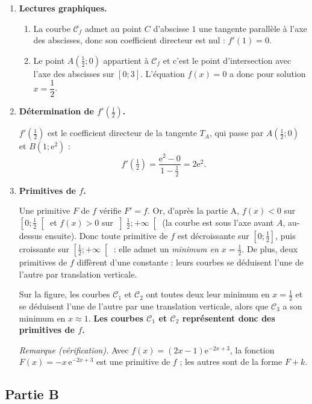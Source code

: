 \documentclass[11pt,a4paper]{article}
\newcommand{\e}{\mathrm{e}}
\begin{document}
\begin{enumerate}

\item \textbf{Lectures graphiques.}

\begin{enumerate}
\item La courbe $\mathcal{C}_f$ admet au point $C$ d'abscisse $1$ une tangente parallèle à l'axe des abscisses,
donc son coefficient directeur est nul : $f'(1)=0$.

\item Le point $A\left(\tfrac12;0\right)$ appartient à $\mathcal{C}_f$ et c'est le point d'intersection
avec l'axe des abscisses sur $[0;3]$. L'équation $f(x)=0$ a donc pour solution $x=\dfrac12$.
\end{enumerate}

\item \textbf{Détermination de $f'\left(\tfrac12\right)$.}

$f'\left(\tfrac12\right)$ est le coefficient directeur de la tangente $T_A$, qui passe par
$A\left(\tfrac12;0\right)$ et $B(1;\e^2)$ :
\[
f'\!\left(\tfrac12\right)=\dfrac{\e^2-0}{1-\tfrac12}=2\e^2.
\]

\item \textbf{Primitives de $f$.}

Une primitive $F$ de $f$ vérifie $F'=f$. Or, d'après la partie A, $f(x)<0$ sur $\left[0;\tfrac12\right[$
et $f(x)>0$ sur $\left]\tfrac12;+\infty\right[$ (la courbe est sous l'axe avant $A$, au-dessus ensuite).
Donc toute primitive de $f$ est décroissante sur $\left[0;\tfrac12\right]$, puis croissante sur
$\left[\tfrac12;+\infty\right[$ : elle admet un \emph{minimum en $x=\tfrac12$}.
De plus, deux primitives de $f$ diffèrent d'une constante : leurs courbes se déduisent l'une de l'autre
par translation verticale.

Sur la figure, les courbes $\mathcal{C}_1$ et $\mathcal{C}_2$ ont toutes deux leur minimum en
$x=\tfrac12$ et se déduisent l'une de l'autre par une translation verticale, alors que $\mathcal{C}_3$
a son minimum en $x\approx 1$.
\textbf{Les courbes $\mathcal{C}_1$ et $\mathcal{C}_2$ représentent donc des primitives de $f$.}

\emph{Remarque (vérification).} Avec $f(x)=(2x-1)\e^{-2x+3}$, la fonction $F(x)=-x\,\e^{-2x+3}$ est
une primitive de $f$ ; les autres sont de la forme $F+k$.
\end{enumerate}

\subsection*{Partie B}
\end{document}
